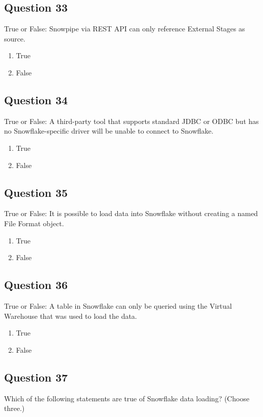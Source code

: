 \documentclass[12pt]{article}
\begin{document}
\subsection*{Question 33}
True or False: Snowpipe via REST API can only reference External Stages as source.

\begin{enumerate}[label=\Alph*.]
  \item True
  \item False
\end{enumerate}

\subsection*{Question 34}
True or False: A third-party tool that supports standard JDBC or ODBC but has no Snowflake-specific driver will be unable to connect to Snowflake.

\begin{enumerate}[label=\Alph*.]
  \item True
  \item False
\end{enumerate}

\subsection*{Question 35}
True or False: It is possible to load data into Snowflake without creating a named File Format object.

\begin{enumerate}[label=\Alph*.]
  \item True
  \item False
\end{enumerate}

\subsection*{Question 36}
True or False: A table in Snowflake can only be queried using the Virtual Warehouse that was used to load the data.

\begin{enumerate}[label=\Alph*.]
  \item True
  \item False
\end{enumerate}

\subsection*{Question 37}
Which of the following statements are true of Snowflake data loading? (Choose three.)
\end{document}

